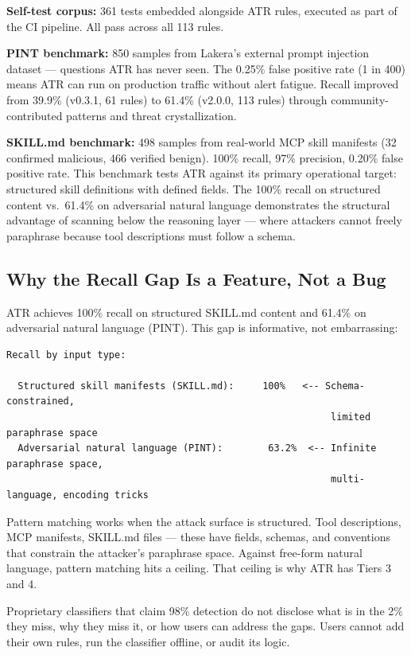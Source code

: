 \documentclass[11pt,letterpaper]{article}
\begin{document}
\textbf{Self-test corpus:} 361 tests embedded alongside ATR rules, executed as part of the CI pipeline. All pass across all 113 rules.

\textbf{PINT benchmark:} 850 samples from Lakera's external prompt injection dataset \cite{pint} --- questions ATR has never seen. The 0.25\% false positive rate (1 in 400) means ATR can run on production traffic without alert fatigue. Recall improved from 39.9\% (v0.3.1, 61 rules) to 61.4\% (v2.0.0, 113 rules) through community-contributed patterns and threat crystallization.

\textbf{SKILL.md benchmark:} 498 samples from real-world MCP skill manifests (32 confirmed malicious, 466 verified benign). 100\% recall, 97\% precision, 0.20\% false positive rate. This benchmark tests ATR against its primary operational target: structured skill definitions with defined fields. The 100\% recall on structured content vs.\ 61.4\% on adversarial natural language demonstrates the structural advantage of scanning below the reasoning layer --- where attackers cannot freely paraphrase because tool descriptions must follow a schema.


\subsection{Why the Recall Gap Is a Feature, Not a Bug}

ATR achieves 100\% recall on structured SKILL.md content and 61.4\% on adversarial natural language (PINT). This gap is informative, not embarrassing:

\begin{lstlisting}
Recall by input type:

  Structured skill manifests (SKILL.md):     100%   <-- Schema-constrained,
                                                         limited paraphrase space
  Adversarial natural language (PINT):        63.2%  <-- Infinite paraphrase space,
                                                         multi-language, encoding tricks
\end{lstlisting}

Pattern matching works when the attack surface is structured. Tool descriptions, MCP manifests, SKILL.md files --- these have fields, schemas, and conventions that constrain the attacker's paraphrase space. Against free-form natural language, pattern matching hits a ceiling. That ceiling is why ATR has Tiers 3 and 4.

Proprietary classifiers that claim 98\% detection do not disclose what is in the 2\% they miss, why they miss it, or how users can address the gaps. Users cannot add their own rules, run the classifier offline, or audit its logic.
\end{document}
